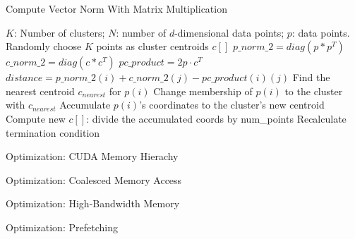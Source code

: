 \documentclass[
nopagebreaks,
style=klope,
fleqn]{powerdot}
\begin{document}
\begin{slide}{Compute Vector Norm With Matrix Multiplication}
  \footnotesize
  \begin{algorithmic}[1]
    \INPUT $K$: Number of clusters; $N$: number of $d$-dimensional data points; $p$: data points.
     \label{alg:pm2}
    \State Randomly choose $K$ points as cluster centroids $c[]$
    \State $p\_norm\_2 = diag(p * p^T)$
    \State $c\_norm\_2 = diag(c * c^T)$
    \State $pc\_product = 2 p \cdot c^T$
    \State $distance = p\_norm\_2(i) + c\_norm\_2(j) - pc\_product(i)(j)$
    \EndFor
    \State Find the nearest centroid $c_{nearest}$ for $p(i)$
    \State Change membership of $p(i)$ to the cluster with $c_{nearest}$
    \State Accumulate $p(i)$'s coordinates to the cluster's new centroid
    \EndParFor
    \State Compute new $c[]$: divide the accumulated coords by num\_points
    \State Recalculate termination condition
    \EndWhile
    \EndFunction
  \end{algorithmic}
\end{slide}

\begin{slide}{Optimization: CUDA Memory Hierachy}
\end{slide}

\begin{slide}{Optimization: Coalesced Memory Access}
\end{slide}

\begin{slide}{Optimization: High-Bandwidth Memory}
\end{slide}

\begin{slide}{Optimization: Prefetching}
\end{slide}
\end{document}
